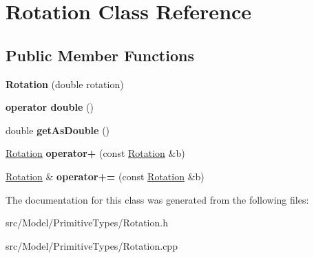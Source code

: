 \hypertarget{classRotation}{}\section{Rotation Class Reference}
\label{classRotation}
\subsection*{Public Member Functions}
\begin{DoxyCompactItemize}
\item 
{\bfseries Rotation} (double rotation)\hypertarget{classRotation_afb6c831e30ce4f7f4e64d3149f67b882}{}\label{classRotation_afb6c831e30ce4f7f4e64d3149f67b882}

\item 
{\bfseries operator double} ()\hypertarget{classRotation_acf2af870f8bfd49e5b088517d9de97b6}{}\label{classRotation_acf2af870f8bfd49e5b088517d9de97b6}

\item 
double {\bfseries get\+As\+Double} ()\hypertarget{classRotation_aca213befaecd3d8a32eda0240f65d0fe}{}\label{classRotation_aca213befaecd3d8a32eda0240f65d0fe}

\item 
\hyperlink{classRotation}{Rotation} {\bfseries operator+} (const \hyperlink{classRotation}{Rotation} \&b)\hypertarget{classRotation_aafdeb5593c0f130e2c3b5ab6f67e07cb}{}\label{classRotation_aafdeb5593c0f130e2c3b5ab6f67e07cb}

\item 
\hyperlink{classRotation}{Rotation} \& {\bfseries operator+=} (const \hyperlink{classRotation}{Rotation} \&b)\hypertarget{classRotation_afc5958ef5204563cfec964b5e7ff45fc}{}\label{classRotation_afc5958ef5204563cfec964b5e7ff45fc}

\end{DoxyCompactItemize}


The documentation for this class was generated from the following files\+:\begin{DoxyCompactItemize}
\item 
src/\+Model/\+Primitive\+Types/Rotation.\+h\item 
src/\+Model/\+Primitive\+Types/Rotation.\+cpp\end{DoxyCompactItemize}
